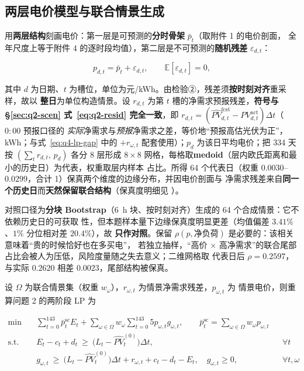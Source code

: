 \subsection{两层电价模型与联合情景生成}\label{sec:q4-price}

用\textbf{两层结构}刻画电价：第一层是可预测的\textbf{分时骨架} \(\bar p_t\)（取附件 1 的电价剖面，
全年尺度上等于附件 4 的逐时段均值），第二层是不可预测的\textbf{随机残差} \(\varepsilon_{d,t}\)：

\begin{equation}
  p_{d,t}=\bar p_t+\varepsilon_{d,t},\qquad \mathbb{E}[\varepsilon_{d,t}]=0 ,
  \label{eq:q4-price}
\end{equation}

其中 \(d\) 为日期、\(t\) 为槽位，单位为元/kWh。由检验②，残差须\textbf{按时刻对齐}重采样，故以
\textbf{整日}为单位构造情景。设 \(r_{d,t}\) 为第 \(t\) 槽的净需求预报残差，\textbf{符号与
\S\ref{sec:q2-scen} 式~\eqref{eq:q2-resid} 完全一致}，即
\(r_{d,t}=(\widehat{PV}^{\text{fcst}}_{d,t}-PV^{\text{act}}_{d,t})\Delta t\)（\(0{:}00\) 预报口径的
\emph{实际}净需求与\emph{预报}净需求之差，等价地“预报高估光伏为正”，kWh；与式~\eqref{eq:q4-lp-gap}
中的 \(+r_{\omega,t}\) 配套使用）；\(p_d\) 为该日平均电价；把 334 天按 \((\sum_tr_{d,t},\,p_d)\) 各分
8 层形成 \(8\times8\) 网格，每格取\textbf{medoid}（层内欧氏距离和最小的历史日）为代表，权重取层内样本
占比。所得 64 个代表日（权重 \(0.0030\)--\(0.0299\)，合计 1）保真两个维度的边缘分布，并因电价剖面与
净需求残差来自\textbf{同一个历史日}而\textbf{天然保留联合结构}（保真度明细见 ）。



对照口径为\textbf{分块 Bootstrap}（6~h 块、按时刻对齐）生成的 64 个合成情景：它不依赖历史日的可获取
性，但本题样本量下边缘保真度明显更差（均值偏差 \(3.41\%\)、\(1\%\) 分位相对差 \(20.4\%\)），故
\textbf{只作对照}。保留 \(\rho(p,\text{净负荷})\) 是必要的：该相关意味着“贵的时候恰好也在多买电”，
若独立抽样，“高价 \(\times\) 高净需求”的联合尾部占比会被人为压低，风险度量随之失去意义；二维网格取
代表日后 \(\rho=0.2597\)，与实际 \(0.2620\) 相差 \(0.0023\)，尾部结构被保真。

设 \(\Omega\) 为联合情景集（权重 \(w_\omega\)），\(r_{\omega,t}\) 为情景净需求残差，\(p_{\omega,t}\) 为
情景电价，则重算问题 2 的两阶段 LP 为

\begin{subequations}\label{eq:q4-lp}
\begin{align}
  \min\quad
  & \sum_{t=0}^{143}\bar p^{\text{sc}}_tE_t+\sum_{\omega\in\Omega}w_\omega\sum_{t=0}^{143}5p_{\omega,t}g_{\omega,t},
  \qquad \bar p^{\text{sc}}_t=\sum_{\omega\in\Omega}w_\omega p_{\omega,t} \label{eq:q4-lp-obj}\\
  \text{s.t.}\quad
  & E_t-c_t+d_t\ \ge\ \bigl(L_t-\widehat{PV}^{(0)}_t\bigr)\Delta t, && \forall t \label{eq:q4-lp-plan}\\
  & g_{\omega,t}\ \ge\ \bigl(L_t-\widehat{PV}^{(0)}_t\bigr)\Delta t+r_{\omega,t}+c_t-d_t-E_t,\quad g_{\omega,t}\ge0, && \forall t,\omega \label{eq:q4-lp-gap}
\end{align}
\end{subequations}

